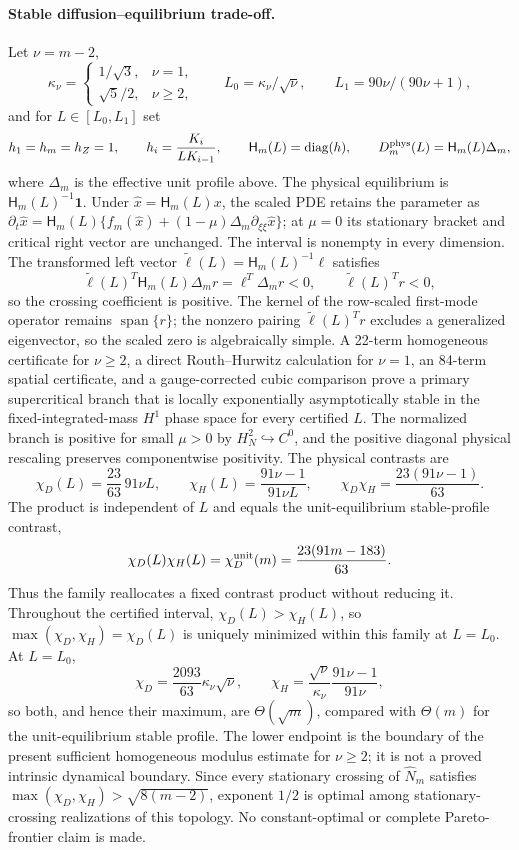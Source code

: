 \documentclass[10pt]{article}
\newcommand{\diag}{\operatorname{diag}}
\begin{document}
\paragraph{Stable diffusion--equilibrium trade-off.}
Let $\nu=m-2$,
\[
\kappa_\nu=\begin{cases}1/\sqrt3,&\nu=1,\\ \sqrt5/2,&\nu\ge2,
\end{cases}
\qquad L_0=\kappa_\nu/\sqrt\nu,
\qquad L_1=90\nu/(90\nu+1),
\]
and for $L\in[L_0,L_1]$ set
\[
h_1=h_m=h_Z=1,\qquad h_i=\frac{K_i}{LK_{i-1}},\qquad
\mathsf H_m(L)=\diag(h),\qquad
D_m^{\rm phys}(L)=\mathsf H_m(L)\Delta_m,
\]
where $\Delta_m$ is the effective unit profile above. The physical equilibrium
is $\mathsf H_m(L)^{-1}\mathbf1$.  Under
$\widehat x=\mathsf H_m(L)x$, the scaled PDE retains the parameter as
$\partial_t\widehat x=\mathsf H_m(L)\{f_m(\widehat x)
+(1-\mu)\Delta_m\partial_{\xi\xi}\widehat x\}$; at $\mu=0$ its
stationary bracket and critical right vector are unchanged.  The interval is
nonempty in every dimension.  The transformed left vector
$\widetilde\ell(L)=\mathsf H_m(L)^{-1}\ell$ satisfies
\[
 \widetilde\ell(L)^T\mathsf H_m(L)\Delta_mr
 =\ell^T\Delta_mr<0,
 \qquad \widetilde\ell(L)^Tr<0,
\]
so the crossing coefficient is positive.  The kernel of the row-scaled
first-mode operator remains
$\operatorname{span}\{r\}$; the nonzero pairing
$\widetilde\ell(L)^Tr$ excludes a generalized eigenvector, so the scaled
zero is algebraically simple.  A
22-term homogeneous certificate for $\nu\ge2$, a direct Routh--Hurwitz
calculation for $\nu=1$, an 84-term spatial certificate, and a
gauge-corrected cubic comparison prove a primary supercritical branch that is
locally exponentially asymptotically stable in the fixed-integrated-mass
$H^1$ phase space for every certified $L$.  The normalized branch is positive
for small $\mu>0$ by $H_N^2\hookrightarrow C^0$, and the positive diagonal
physical rescaling preserves componentwise positivity.  The physical contrasts are
\[
\chi_D(L)=\frac{23}{63}\,91\nu L,
\qquad
\chi_H(L)=\frac{91\nu-1}{91\nu L},
\qquad
\chi_D\chi_H=\frac{23(91\nu-1)}{63}.
\]
The product is independent of $L$ and equals the unit-equilibrium
stable-profile contrast,
\[
 \chi_D(L)\chi_H(L)=\chi_D^{\rm unit}(m)
 =\frac{23(91m-183)}{63}.
\]
Thus the family reallocates a fixed contrast product without reducing it.
Throughout the certified interval, $\chi_D(L)>\chi_H(L)$, so
$\max(\chi_D,\chi_H)=\chi_D(L)$ is uniquely minimized within this family at
$L=L_0$.
At $L=L_0$,
\[
 \chi_D=\frac{2093}{63}\kappa_\nu\sqrt\nu,
 \qquad
 \chi_H=\frac{\sqrt\nu}{\kappa_\nu}\frac{91\nu-1}{91\nu},
\]
so both, and hence their maximum, are $\Theta(\sqrt m)$, compared with
$\Theta(m)$ for the unit-equilibrium stable profile.  The lower endpoint is the
boundary of the present sufficient homogeneous modulus estimate for
$\nu\ge2$; it is not a proved intrinsic dynamical boundary. Since every
stationary crossing of $\widehat N_m$ satisfies
$\max(\chi_D,\chi_H)>\sqrt{8(m-2)}$, exponent $1/2$ is optimal among
stationary-crossing realizations of this topology. No constant-optimal or
complete Pareto-frontier claim is made.
\end{document}
